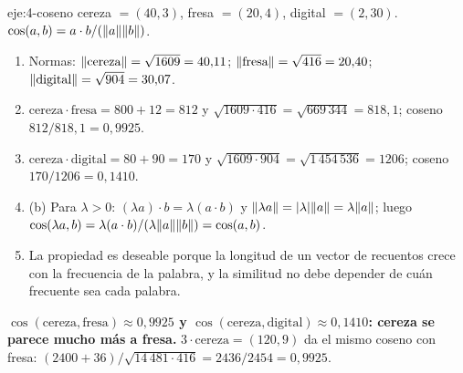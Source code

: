\begin{solucion}{eje:4-coseno}
\datos cereza $=(40,3)$, fresa $=(20,4)$, digital $=(2,30)$.
\planteamiento $\cos(a,b)=a\cdot b/(\lVert a\rVert\lVert b\rVert)$.
\pasos
\begin{enumerate}[label=\arabic*.]
  \item Normas: $\lVert\text{cereza}\rVert=\sqrt{1609}=40{,}11$; $\lVert\text{fresa}\rVert=\sqrt{416}=20{,}40$; $\lVert\text{digital}\rVert=\sqrt{904}=30{,}07$.
  \item $\text{cereza}\cdot\text{fresa}=800+12=812$ y $\sqrt{1609\cdot 416}=\sqrt{669\,344}=818{,}1$; coseno $812/818{,}1=0{,}9925$.
  \item $\text{cereza}\cdot\text{digital}=80+90=170$ y $\sqrt{1609\cdot 904}=\sqrt{1\,454\,536}=1206$; coseno $170/1206=0{,}1410$.
  \item (b) Para $\lambda>0$: $(\lambda a)\cdot b=\lambda(a\cdot b)$ y $\lVert\lambda a\rVert=\lvert\lambda\rvert\lVert a\rVert=\lambda\lVert a\rVert$; luego $\cos(\lambda a,b)=\lambda(a\cdot b)/(\lambda\lVert a\rVert\lVert b\rVert)=\cos(a,b)$.
  \item La propiedad es deseable porque la longitud de un vector de recuentos crece con la frecuencia de la palabra, y la similitud no debe depender de cuán frecuente sea cada palabra.
\end{enumerate}
\resultado \textbf{$\cos(\text{cereza},\text{fresa})\approx 0{,}9925$ y $\cos(\text{cereza},\text{digital})\approx 0{,}1410$: cereza se parece mucho más a fresa.}
\comprobacion $3\cdot\text{cereza}=(120,9)$ da el mismo coseno con fresa: $(2400+36)/\sqrt{14\,481\cdot 416}=2436/2454=0{,}9925$.
\end{solucion}

